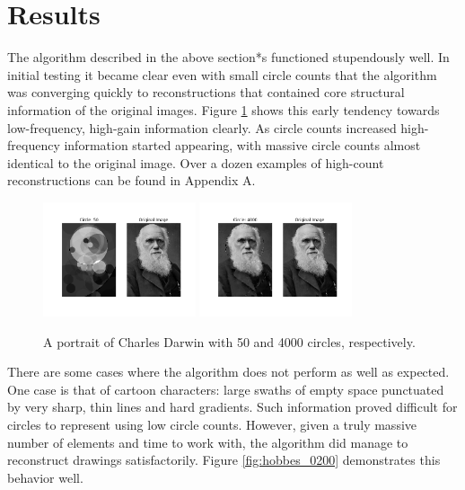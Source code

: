 \documentclass[12pt]{article}
\begin{document}
\section*{Results}
The algorithm described in the above section*s functioned stupendously well. In initial testing it became clear even with small circle counts that the algorithm was converging quickly to reconstructions that contained core structural information of the original images. Figure \ref{fig:darwin_0050} shows this early tendency towards low-frequency, high-gain information clearly. As circle counts increased high-frequency information started appearing, with massive circle counts almost identical to the original image. Over a dozen examples of high-count reconstructions can be found in Appendix A. 
\begin{figure}[H]
\centering
\noindent\includegraphics[width=0.4\textwidth]{../results/darwin/darwin_0050}
\noindent\includegraphics[width=0.4\textwidth]{../results/darwin/darwin_4000}
\caption{A portrait of Charles Darwin with 50 and 4000 circles, respectively. }
\label{fig:darwin_0050}
\end{figure}
There are some cases where the algorithm does not perform as well as expected. One case is that of cartoon characters: large swaths of empty space punctuated by very sharp, thin lines and hard gradients. Such information proved difficult for circles to represent using low circle counts. However, given a truly massive number of elements and time to work with, the algorithm did manage to reconstruct drawings satisfactorily. Figure \ref{fig:hobbes_0200} demonstrates this behavior well. 
\end{document}
